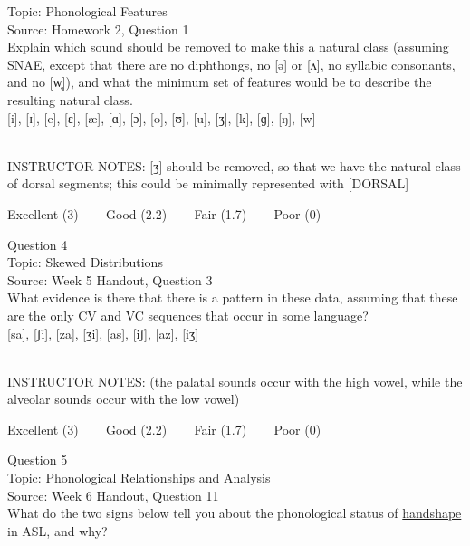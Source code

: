 \documentclass[12pt]{article}
\begin{document}
Topic: Phonological Features\\
Source: Homework 2, Question 1\\

Explain which sound should be removed to make this a natural class (assuming SNAE, except that there are no diphthongs, no [ə] or [ʌ], no syllabic consonants, and no [w̥]), and what the minimum set of features would be to describe the resulting natural class.\\

{[i]}, {[ɪ]}, {[e]}, {[ɛ]}, {[æ]}, {[ɑ]}, {[ɔ]}, {[o]}, {[ʊ]}, {[u]}, {[ʒ]}, {[k]}, {[ɡ]}, {[ŋ]}, {[w]}


~\\
INSTRUCTOR NOTES: [ʒ] should be removed, so that we have the natural class of dorsal segments; this could be minimally represented with [DORSAL]


\vfill
Excellent (3) ~~~ Good (2.2) ~~~ Fair (1.7) ~~~ Poor (0)
\newpage

{\large Question 4}\\

Topic: Skewed Distributions\\
Source: Week 5 Handout, Question 3\\

What evidence is there that there is a pattern in these data, assuming that these are the only CV and VC sequences that occur in some language?\\

{[sa]}, {[ʃi]}, {[za]}, {[ʒi]}, {[as]}, {[iʃ]}, {[az]}, {[iʒ]}


~\\
INSTRUCTOR NOTES: (the palatal sounds occur with the high vowel, while the alveolar sounds occur with the low vowel)


\vfill
Excellent (3) ~~~ Good (2.2) ~~~ Fair (1.7) ~~~ Poor (0)
\newpage

{\large Question 5}\\

Topic: Phonological Relationships and Analysis\\
Source: Week 6 Handout, Question 11\\

What do the two signs below tell you about the phonological status of \underline{handshape} in ASL, and why?\\
\end{document}
